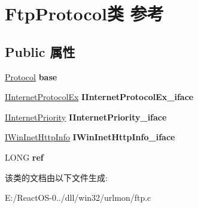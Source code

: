 \hypertarget{struct_ftp_protocol}{}\section{Ftp\+Protocol类 参考}
\label{struct_ftp_protocol}
\subsection*{Public 属性}
\begin{DoxyCompactItemize}
\item 
\mbox{\label{struct_ftp_protocol_a6b158d23e84903a8592e64fbc5c373db}} 
\hyperlink{struct_protocol}{Protocol} {\bfseries base}
\item 
\mbox{\label{struct_ftp_protocol_a23c46e88faf864d472fe703b221be96a}} 
\hyperlink{interface_i_internet_protocol_ex}{I\+Internet\+Protocol\+Ex} {\bfseries I\+Internet\+Protocol\+Ex\+\_\+iface}
\item 
\mbox{\label{struct_ftp_protocol_aeda1c9b4a9172e98de1a5bbd27af5ace}} 
\hyperlink{interface_i_internet_priority}{I\+Internet\+Priority} {\bfseries I\+Internet\+Priority\+\_\+iface}
\item 
\mbox{\label{struct_ftp_protocol_a42a56e9d30ee20ac4debcbaecb7a6863}} 
\hyperlink{interface_i_win_inet_http_info}{I\+Win\+Inet\+Http\+Info} {\bfseries I\+Win\+Inet\+Http\+Info\+\_\+iface}
\item 
\mbox{\label{struct_ftp_protocol_a42dd24921149d90b82ff0b5a2f1b8f9e}} 
L\+O\+NG {\bfseries ref}
\end{DoxyCompactItemize}


该类的文档由以下文件生成\+:\begin{DoxyCompactItemize}
\item 
E\+:/\+React\+O\+S-\/0../dll/win32/urlmon/ftp.\+c\end{DoxyCompactItemize}
